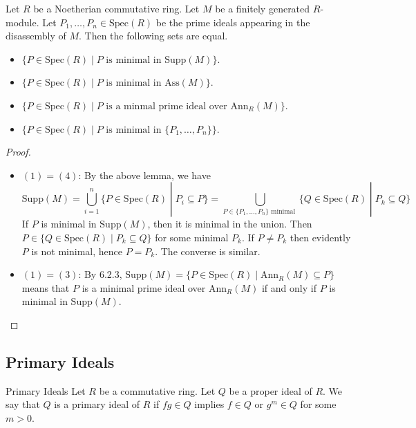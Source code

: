 \documentclass[a4paper]{article}
\begin{document}
\begin{prp}{}{} Let $R$ be a Noetherian commutative ring. Let $M$ be a finitely generated $R$-module. Let $P_1,\dots,P_n\in\text{Spec}(R)$ be the prime ideals appearing in the disassembly of $M$. Then the following sets are equal. 
\begin{itemize}
\item $\{P\in\text{Spec}(R)\;|\;P\text{ is minimal in }\text{Supp}(M)\}$. 
\item $\{P\in\text{Spec}(R)\;|\;P\text{ is minimal in }\text{Ass}(M)\}$. 
\item $\{P\in\text{Spec}(R)\;|\;P\text{ is a minmal prime ideal over }\text{Ann}_R(M)\}$. 
\item $\{P\in\text{Spec}(R)\;|\;P\text{ is minimal in }\{P_1,\dots,P_n\}\}$. 
\end{itemize} \tcbline
\begin{proof}~\\
\begin{itemize}
\item $(1)=(4)$: By the above lemma, we have $$\text{Supp}(M)=\bigcup_{i=1}^n\{P\in\text{Spec}(R)\;|\;P_i\subseteq P\}=\bigcup_{P\in\{P_1,\dots,P_n\}\text{ minimal }}\{Q\in\text{Spec}(R)\;|\;P_k\subseteq Q\}$$ If $P$ is minimal in $\text{Supp}(M)$, then it is minimal in the union. Then $P\in\{Q\in\text{Spec}(R)\;|\;P_k\subseteq Q\}$ for some minimal $P_k$. If $P\neq P_k$ then evidently $P$ is not minimal, hence $P=P_k$. The converse is similar. 
\item $(1)=(3)$: By 6.2.3, $\text{Supp}(M)=\{P\in\text{Spec}(R)\;|\;\text{Ann}_R(M)\subseteq P\}$ means that $P$ is a minimal prime ideal over $\text{Ann}_R(M)$ if and only if $P$ is minimal in $\text{Supp}(M)$. 
\end{itemize}
\end{proof}
\end{prp}

\subsection{Primary Ideals}
\begin{defn}{Primary Ideals}{} Let $R$ be a commutative ring. Let $Q$ be a proper ideal of $R$. We say that $Q$ is a primary ideal of $R$ if $fg\in Q$ implies $f\in Q$ or $g^m\in Q$ for some $m>0$. 
\end{defn}
\end{document}

